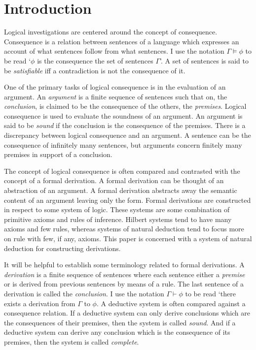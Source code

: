 \documentclass[12pt]{article}
\theoremstyle{definition}
\theoremstyle{remark}
\begin{document}
\maketitle

\section{Introduction}

Logical investigations are centered around the concept of consequence. Consequence is a relation between sentences of a language which expresses an account of what sentences follow from what sentences\cite{restallbeall}. I use the notation $\Gamma \models \phi$ to be read `$\phi$ is the consequence the set of sentences $\Gamma$'. A set of sentences is said to be \textit{satisfiable} iff a contradiction is not the consequence of it.

One of the primary tasks of logical consequence is in the evaluation of an argument. An \textit{argument} is a finite sequence of sentences such that on, the \textit{conclusion}, is claimed to be the consequence of the others, the \textit{premises}. Logical consequence is used to evaluate the soundness of an argument. An argument is said to be \textit{sound} if the conclusion is the consequence of the premises. There is a discrepancy between logical consequence and an argument. A sentence can be the consequence of infinitely many sentences, but arguments concern finitely many premises in support of a conclusion.

The concept of logical consequence is often compared and contrasted with the concept of a formal derivation. A formal derivation can be thought of an abstraction of an argument. A formal derivation abstracts away the semantic content of an argument leaving only the form. Formal derivations are constructed in respect to some system of logic. These systems are some combination of primitive axioms and rules of inference. Hilbert systems tend to have many axioms and few rules, whereas systems of natural deduction tend to focus more on rule with few, if any, axioms. This paper is concerned with a system of natural deduction for constructing derivations.

It will be helpful to establish some terminology related to formal derivations. A \textit{derivation} is a finite sequence of sentences where each sentence either a \textit{premise} or is derived from previous sentences by means of a rule. The last sentence of a derivation is called the \textit{conclusion}. I use the notation $\Gamma \vdash \phi$ to be read `there exists a derivation from $\Gamma$ to $\phi$. A deductive system is often compared against a consequence relation. If a deductive system can only derive conclusions which are the consequences of their premises, then the system is called \textit{sound}. And if a deductive system can derive any conclusion which is the consequence of its premises, then the system is called \textit{complete}.
\end{document}
